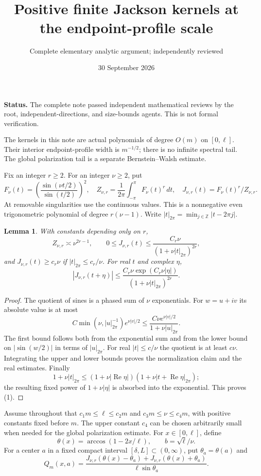 \documentclass[11pt]{article}
\title{Positive finite Jackson kernels at the endpoint-profile scale}
\author{Complete elementary analytic argument; independently reviewed}
\date{30 September 2026}
\newtheorem{lemma}{Lemma}\newtheorem{theorem}{Theorem}
\begin{document}
\maketitle
\noindent\textbf{Status.} The complete note passed independent mathematical reviews by the root, independent-directions, and size-bounds agents. This is not formal verification.

The kernels in this note are actual polynomials of degree $O(m)$ on
$[0,\ell]$. Their interior endpoint-profile width is $m^{-1/2}$;
there is no infinite spectral tail. The global polarization tail is a
separate Bernstein--Walsh estimate.

Fix an integer $r\ge2$. For an integer $\nu\ge2$, put
\[
 F_\nu(t)=\left(\frac{\sin(\nu t/2)}{\sin(t/2)}\right)^2,
 \quad Z_{\nu,r}=\frac1{2\pi}\int_{-\pi}^{\pi}F_\nu(t)^r\,dt,
 \quad J_{\nu,r}(t)=F_\nu(t)^r/Z_{\nu,r}.
\]
At removable singularities use the continuous values. This is a
nonnegative even trigonometric polynomial of degree $r(\nu-1)$.
Write $|t|_{2\pi}=\min_{j\in\mathbb Z}|t-2\pi j|$.

\begin{lemma}\label{trig}
With constants depending only on $r$,
\[
 Z_{\nu,r}\asymp\nu^{2r-1},\qquad
 0\le J_{\nu,r}(t)\le
       \frac{C_r\nu}{(1+\nu|t|_{2\pi})^{2r}},
\]
and $J_{\nu,r}(t)\ge c_r\nu$ if $|t|_{2\pi}\le c_r/\nu$.
For real $t$ and complex $\eta$,
\[
 |J_{\nu,r}(t+\eta)|\le
 \frac{C_r\nu\exp(C_r\nu|\eta|)}
      {(1+\nu|t|_{2\pi})^{2r}}.                         \tag{1}
\]
\end{lemma}
\begin{proof}
The quotient of sines is a phased sum of $\nu$ exponentials.
For $w=u+iv$ its absolute value is at most
\[
 C\min(\nu,|u|_{2\pi}^{-1})e^{\nu|v|/2}
 \le\frac{C\nu e^{\nu|v|/2}}{1+\nu|u|_{2\pi}}.
\]
The first bound follows both from the exponential sum and from the
lower bound on $|\sin(w/2)|$ in terms of $|u|_{2\pi}$.
For real $|t|\le c/\nu$ the quotient is at least $c\nu$.
Integrating the upper and lower bounds proves the normalization claim
and the real estimates. Finally
\[
 1+\nu|t|_{2\pi}\le
 (1+\nu|\operatorname{Re}\eta|)
 (1+\nu|t+\operatorname{Re}\eta|_{2\pi});
\]
the resulting fixed power of $1+\nu|\eta|$ is absorbed into the
exponential. This proves (1).
\end{proof}

Assume throughout that $c_1m\le\ell\le c_2m$ and
$c_3m\le\nu\le c_4m$, with positive constants fixed before $m$.
The upper constant $c_4$ can be chosen arbitrarily small when needed
for the global polarization estimate. For $x\in[0,\ell]$, define
\[
 \theta(x)=\arccos(1-2x/\ell),\qquad b=\sqrt\ell/\nu.
\]
For a center $a$ in a fixed compact interval $[\delta,L]\subset(0,\infty)$,
put $\theta_a=\theta(a)$ and
\[
 Q_m(x,a)=\frac{J_{\nu,r}(\theta(x)-\theta_a)
                   +J_{\nu,r}(\theta(x)+\theta_a)}
                  {\ell\sin\theta_a}.                  \tag{2}
\]
\end{document}
